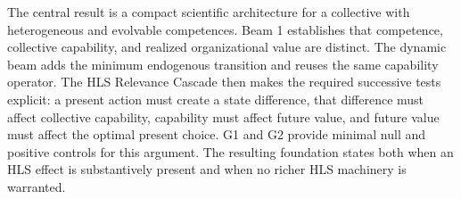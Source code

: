 \documentclass[10pt]{article}
\begin{document}
The central result is a compact scientific architecture for a collective with
heterogeneous and evolvable competences. Beam 1 establishes that competence,
collective capability, and realized organizational value are distinct. The
dynamic beam adds the minimum endogenous transition and reuses the same
capability operator. The HLS Relevance Cascade then makes the required
successive tests explicit: a present action must create a state difference,
that difference must affect collective capability, capability must affect
future value, and future value must affect the optimal present choice. G1 and
G2 provide minimal null and positive controls for this argument. The resulting
foundation states both when an HLS effect is substantively present and when no
richer HLS machinery is warranted.



\end{document}
